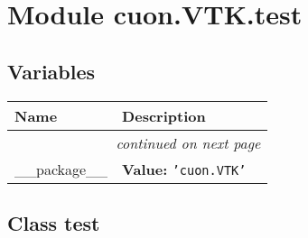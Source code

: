%
%
%


\section{Module cuon.VTK.test}

    \label{cuon:VTK:test}


  \subsection{Variables}

    \vspace{-1cm}
\hspace{\varindent}\begin{longtable}{|p{\varnamewidth}|p{\vardescrwidth}|l}
\cline{1-2}
\cline{1-2} \centering \textbf{Name} & \centering \textbf{Description}& \\
\cline{1-2}
\endhead\cline{1-2}\multicolumn{3}{r}{\small\textit{continued on next page}}\\\endfoot\cline{1-2}
\endlastfoot\raggedright \_\-\_\-p\-a\-c\-k\-a\-g\-e\-\_\-\_\- & \raggedright \textbf{Value:} 
{\tt \texttt{'}\texttt{cuon.VTK}\texttt{'}}&\\
\cline{1-2}
\end{longtable}



\subsection{Class test}

